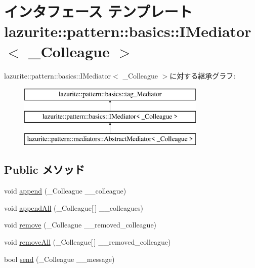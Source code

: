 \hypertarget{interfacelazurite_1_1pattern_1_1basics_1_1_i_mediator_3_01___colleague_01_4}{
\section{インタフェース テンプレート lazurite::pattern::basics::IMediator$<$ \_\-Colleague $>$}
\label{interfacelazurite_1_1pattern_1_1basics_1_1_i_mediator_3_01___colleague_01_4}
}
lazurite::pattern::basics::IMediator$<$ \_\-Colleague $>$に対する継承グラフ:\begin{figure}[H]
\begin{center}
\leavevmode
\includegraphics[height=3cm]{interfacelazurite_1_1pattern_1_1basics_1_1_i_mediator_3_01___colleague_01_4}
\end{center}
\end{figure}
\subsection*{Public メソッド}
\begin{DoxyCompactItemize}
\item 
void \hyperlink{interfacelazurite_1_1pattern_1_1basics_1_1_i_mediator_3_01___colleague_01_4_a2141258ad0ee2979eb65d5a39cb464a8}{append} (\_\-Colleague \_\-\_\-colleague)
\item 
void \hyperlink{interfacelazurite_1_1pattern_1_1basics_1_1_i_mediator_3_01___colleague_01_4_ae4d319025b48060df543d4d3c654bfb5}{appendAll} (\_\-Colleague\mbox{[}$\,$\mbox{]} \_\-\_\-colleagues)
\item 
void \hyperlink{interfacelazurite_1_1pattern_1_1basics_1_1_i_mediator_3_01___colleague_01_4_aaeaaca17d4e64f068539fb68f5049f4a}{remove} (\_\-Colleague \_\-\_\-removed\_\-colleague)
\item 
void \hyperlink{interfacelazurite_1_1pattern_1_1basics_1_1_i_mediator_3_01___colleague_01_4_a9ddd29033f71ca3f8b5e15a1ac9de5ff}{removeAll} (\_\-Colleague\mbox{[}$\,$\mbox{]} \_\-\_\-removed\_\-colleague)
\item 
bool \hyperlink{interfacelazurite_1_1pattern_1_1basics_1_1_i_mediator_3_01___colleague_01_4_a60b933645ef7e6f3fd5c9de47bda90df}{send} (\_\-Colleague \_\-\_\-message)
\end{DoxyCompactItemize}


